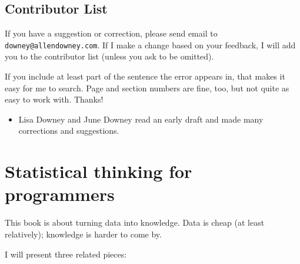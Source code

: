 \documentclass[12pt]{book}
\begin{document}
\section*{Contributor List}


If you have a suggestion or correction, please send email to 
{\tt downey@allendowney.com}.  If I make a change based on your
feedback, I will add you to the contributor list
(unless you ask to be omitted).

If you include at least part of the sentence the
error appears in, that makes it easy for me to search.  Page and
section numbers are fine, too, but not quite as easy to work with.
Thanks!

\small

\begin{itemize}

\item Lisa Downey and June Downey read an early draft and made many
corrections and suggestions.


\end{itemize}

\normalsize

\clearemptydoublepage

\begin{latexonly}

\tableofcontents

\clearemptydoublepage

\end{latexonly}

\mainmatter


\chapter{Statistical thinking for programmers}
\label{intro}

This book is about turning data into knowledge.  Data is cheap (at
least relatively); knowledge is harder to come by.

I will present three related pieces:
\end{document}
